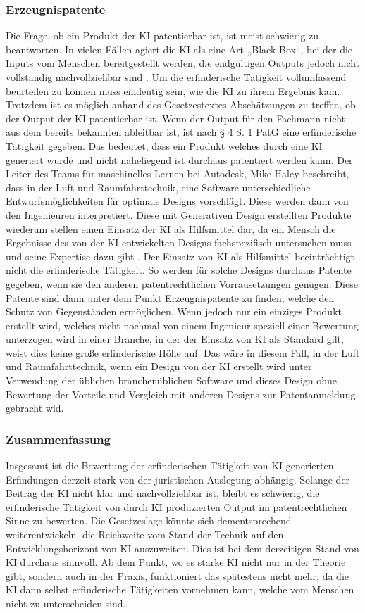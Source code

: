 \subsubsection{Erzeugnispatente}
Die Frage, ob ein Produkt der KI patentierbar ist, ist
meist schwierig zu beantworten.
In vielen Fällen agiert die KI als eine Art „Black Box“, 
bei der die Inputs vom Menschen bereitgestellt werden, 
die endgültigen Outputs jedoch nicht vollständig nachvollziehbar sind 
\cite{pauliniKIgenerierteErfindungPatentrechtliche}. 
Um die erfinderische Tätigkeit vollumfassend beurteilen zu können
muss eindeutig sein, wie die KI zu ihrem Ergebnis kam. 
Trotzdem ist es möglich anhand des Gesetzestextes Abschätzungen
zu treffen, ob der Output der KI patentierbar ist.
Wenn der Output für den Fachmann nicht aus dem bereits bekannten 
ableitbar ist, ist nach § 4 S. 1 PatG eine erfinderische Tätigkeit gegeben.
Das bedeutet, dass ein Produkt welches durch eine KI generiert
wurde und nicht naheliegend ist durchaus patentiert werden kann.
Der Leiter des Teams für maschinelles Lernen bei Autodesk,
Mike Haley beschreibt, dass in der Luft-und Raumfahrttechnik,
eine Software unterschiedliche Entwurfsmöglichkeiten für optimale
Designs vorschlägt. Diese werden dann von den Ingenieuren interpretiert.
Diese mit Generativen Design erstellten Produkte
wiederum stellen einen Einsatz der KI als Hilfsmittel dar, da
ein Mensch die Ergebnisse des von der KI-entwickelten
Designs fachspezifisch untersuchen muss und seine Expertise dazu
gibt
\cite{WieManPatente2021}. Der Einsatz von KI
als Hilfsmittel beeinträchtigt nicht die erfinderische Tätigkeit.
So werden für solche Designs durchaus Patente gegeben, 
wenn sie den anderen patentrechtlichen Vorrausetzungen genügen.
Diese Patente sind dann unter dem Punkt Erzeugnispatente zu 
finden, welche den Schutz von Gegenständen ermöglichen.
Wenn jedoch nur ein einziges Produkt erstellt wird, 
welches nicht nochmal von einem Ingenieur speziell 
einer Bewertung unterzogen wird in einer Branche, 
in der der Einsatz von KI als Standard gilt, weist 
dies keine große erfinderische Höhe auf. Das wäre in 
diesem Fall, in der Luft und Raumfahrttechnik,
wenn ein Design von der KI erstellt wird unter 
Verwendung der üblichen branchenüblichen Software
und dieses Design ohne Bewertung der Vorteile und 
Vergleich mit anderen Designs zur Patentanmeldung gebracht wid.
\subsubsection{Zusammenfassung}
Insgesamt ist die Bewertung der erfinderischen Tätigkeit
von KI-generierten Erfindungen derzeit stark von der juristischen Auslegung abhängig. 
Solange der Beitrag der KI nicht klar und nachvollziehbar ist, 
bleibt es schwierig, 
die erfinderische Tätigkeit von durch KI produzierten Output
im patentrechtlichen Sinne zu bewerten.
Die Gesetzeslage könnte sich dementsprechend weiterentwickeln, 
die Reichweite 
vom Stand der Technik auf den Entwicklungshorizont von KI auszuweiten.
Dies ist bei dem derzeitigen Stand von KI durchaus sinnvoll.
Ab dem Punkt, wo es starke KI nicht nur in der Theorie gibt,
sondern auch in der Praxis, funktioniert das spätestens nicht mehr,
da die KI dann selbst erfinderische Tätigkeiten vornehmen kann, welche vom 
Menschen nicht zu unterscheiden sind.
